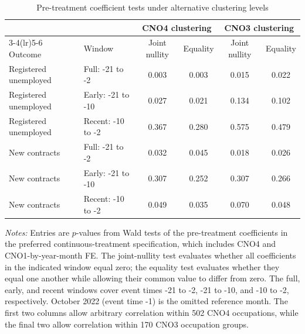 \begin{table}[!htbp]
\centering
\caption{Pre-treatment coefficient tests under alternative clustering levels}
\label{tab:v1_pretrends}
\begin{threeparttable}
\scriptsize
\setlength{\tabcolsep}{4pt}
\begin{tabular}{llcccc}
\toprule
& & \multicolumn{2}{c}{CNO4 clustering} & \multicolumn{2}{c}{CNO3 clustering} \\
\cmidrule(lr){3-4}\cmidrule(lr){5-6}
Outcome & Window & Joint nullity & Equality & Joint nullity & Equality \\
\midrule
Registered unemployed & Full: -21 to -2 & 0.003 & 0.003 & 0.015 & 0.022 \\
Registered unemployed & Early: -21 to -10 & 0.027 & 0.021 & 0.134 & 0.102 \\
Registered unemployed & Recent: -10 to -2 & 0.367 & 0.280 & 0.575 & 0.479 \\
\addlinespace
New contracts & Full: -21 to -2 & 0.032 & 0.045 & 0.018 & 0.026 \\
New contracts & Early: -21 to -10 & 0.307 & 0.252 & 0.307 & 0.266 \\
New contracts & Recent: -10 to -2 & 0.049 & 0.035 & 0.070 & 0.048 \\
\bottomrule
\end{tabular}
\begin{tablenotes}[flushleft]
\footnotesize
\item \emph{Notes:} Entries are $p$-values from Wald tests of the pre-treatment coefficients in the preferred continuous-treatment specification, which includes CNO4 and CNO1-by-year-month FE. The joint-nullity test evaluates whether all coefficients in the indicated window equal zero; the equality test evaluates whether they equal one another while allowing their common value to differ from zero. The full, early, and recent windows cover event times -21 to -2, -21 to -10, and -10 to -2, respectively. October 2022 (event time -1) is the omitted reference month. The first two columns allow arbitrary correlation within 502 CNO4 occupations, while the final two allow correlation within 170 CNO3 occupation groups.
\end{tablenotes}
\end{threeparttable}
\end{table}
